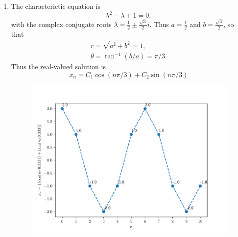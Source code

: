 \begin{homeworkProblem}
\begin{enumerate}
        \item The characterictic equation is \[
            \lambda^2 - \lambda + 1 = 0,
        \]
        with the complex conjugate roots
        $\lambda = \frac{1}{2} \pm \frac{\sqrt{3}}{2}i$.
        Thus $a = \frac{1}{2}$ and $b = \frac{\sqrt{3}}{2}$,
        so that \[
            \begin{aligned}
                r = \sqrt{a^2 + b^2} = 1,\\
                \theta = \tan^{-1}(b/a) = \pi/3.
            \end{aligned}
        \]
        Thus the real-valued solution is \[
            x_n = C_1 \cos (n\pi/3) + C_2 \sin (n\pi/3)
        \]
        \begin{figure}[H]
            \centering
            \includegraphics[scale=0.5]{fig/fig9(b).pdf}
        \end{figure}

    \end{enumerate}
    \end{homeworkProblem}